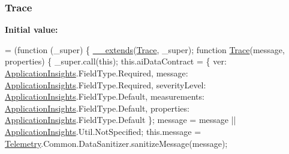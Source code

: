 \subsubsection[{\texorpdfstring{Trace}{Trace}}]{ Trace}\hypertarget{obj_2_release_2_package_2_package_tmp_2_scripts_2ai_80_822_89-build00167_8js_a3867abf13e2de1973401ad4ea465f38d}{}\label{obj_2_release_2_package_2_package_tmp_2_scripts_2ai_80_822_89-build00167_8js_a3867abf13e2de1973401ad4ea465f38d}
{\bfseries Initial value\+:}
\begin{DoxyCode}
= (\textcolor{keyword}{function} (\_super) \{
                \hyperlink{obj_2_release_2_package_2_package_tmp_2_scripts_2ai_80_822_89-build00167_8js_ac09f4951ac4b25df0272d4e78ff85ae0}{\_\_extends}(\hyperlink{obj_2_release_2_package_2_package_tmp_2_scripts_2ai_80_822_89-build00167_8js_a3867abf13e2de1973401ad4ea465f38d}{Trace}, \_super);
                \textcolor{keyword}{function} \hyperlink{obj_2_release_2_package_2_package_tmp_2_scripts_2ai_80_822_89-build00167_8js_a3867abf13e2de1973401ad4ea465f38d}{Trace}(message, properties) \{
                    \_super.call(\textcolor{keyword}{this});
                    this.aiDataContract = \{
                        ver: \hyperlink{obj_2_release_2_package_2_package_tmp_2_scripts_2ai_80_822_89-build00167_8js_aa415ef4f8cdd699689ef4b61db7656d8}{ApplicationInsights}.FieldType.Required,
                        message: \hyperlink{obj_2_release_2_package_2_package_tmp_2_scripts_2ai_80_822_89-build00167_8js_aa415ef4f8cdd699689ef4b61db7656d8}{ApplicationInsights}.FieldType.Required,
                        severityLevel: \hyperlink{obj_2_release_2_package_2_package_tmp_2_scripts_2ai_80_822_89-build00167_8js_aa415ef4f8cdd699689ef4b61db7656d8}{ApplicationInsights}.FieldType.Default,
                        measurements: \hyperlink{obj_2_release_2_package_2_package_tmp_2_scripts_2ai_80_822_89-build00167_8js_aa415ef4f8cdd699689ef4b61db7656d8}{ApplicationInsights}.FieldType.Default,
                        properties: \hyperlink{obj_2_release_2_package_2_package_tmp_2_scripts_2ai_80_822_89-build00167_8js_aa415ef4f8cdd699689ef4b61db7656d8}{ApplicationInsights}.FieldType.Default
                    \};
                    message = message || \hyperlink{obj_2_release_2_package_2_package_tmp_2_scripts_2ai_80_822_89-build00167_8js_aa415ef4f8cdd699689ef4b61db7656d8}{ApplicationInsights}.Util.NotSpecified;
                    this.message = \hyperlink{obj_2_release_2_package_2_package_tmp_2_scripts_2ai_80_822_89-build00167_8js_ae256f6f49305d910c46af8e5b9ef950f}{Telemetry}.Common.DataSanitizer.sanitizeMessage(message);

\end{DoxyCode}
